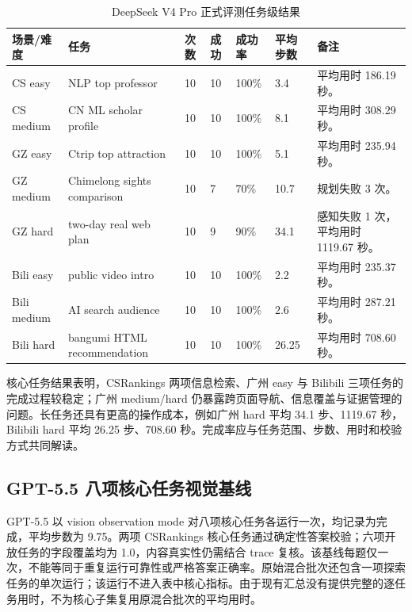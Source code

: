 \begin{table}[H]
  \centering
  \caption{DeepSeek V4 Pro 正式评测任务级结果}
  \label{tab:deepseek-repeat}
  \small
  \setlength{\tabcolsep}{4pt}
  \begin{tabularx}{\textwidth}{p{}Yp{0.08\textwidth}p{0.10\textwidth}p{0.10\textwidth}p{0.11\textwidth}p{0.13\textwidth}}
    \toprule
    场景/难度 & 任务 & 次数 & 成功 & 成功率 & 平均步数 & 备注 \\
    \midrule
    CS easy & NLP top professor & 10 & 10 & 100\% & 3.4 & 平均用时 186.19 秒。\\
    CS medium & CN ML scholar profile & 10 & 10 & 100\% & 8.1 & 平均用时 308.29 秒。\\
    GZ easy & Ctrip top attraction & 10 & 10 & 100\% & 5.1 & 平均用时 235.94 秒。\\
    GZ medium & Chimelong sights comparison & 10 & 7 & 70\% & 10.7 & 规划失败 3 次。\\
    GZ hard & two-day real web plan & 10 & 9 & 90\% & 34.1 & 感知失败 1 次，平均用时 1119.67 秒。\\
    Bili easy & public video intro & 10 & 10 & 100\% & 2.2 & 平均用时 235.37 秒。\\
    Bili medium & AI search audience & 10 & 10 & 100\% & 2.6 & 平均用时 287.21 秒。\\
    Bili hard & bangumi HTML recommendation & 10 & 10 & 100\% & 26.25 & 平均用时 708.60 秒。\\
    \bottomrule
  \end{tabularx}
\end{table}

核心任务结果表明，CSRankings 两项信息检索、广州 easy 与 Bilibili 三项任务的完成过程较稳定；广州 medium/hard 仍暴露跨页面导航、信息覆盖与证据管理的问题。长任务还具有更高的操作成本，例如广州 hard 平均 34.1 步、1119.67 秒，Bilibili hard 平均 26.25 步、708.60 秒。完成率应与任务范围、步数、用时和校验方式共同解读。

\subsection{GPT-5.5 八项核心任务视觉基线}

GPT-5.5 以 vision observation mode 对八项核心任务各运行一次，均记录为完成，平均步数为 9.75。两项 CSRankings 核心任务通过确定性答案校验；六项开放任务的字段覆盖均为 1.0，内容真实性仍需结合 trace 复核。该基线每题仅一次，不能等同于重复运行可靠性或严格答案正确率。原始混合批次还包含一项探索任务的单次运行；该运行不进入表中核心指标。由于现有汇总没有提供完整的逐任务用时，不为核心子集复用原混合批次的平均用时。

